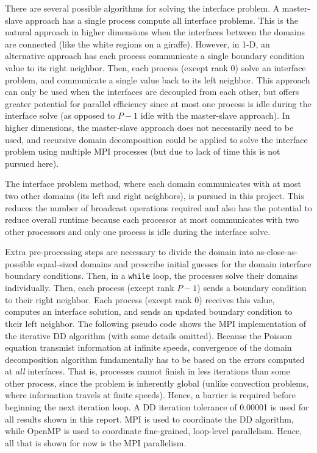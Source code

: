 \documentclass[10pt]{article}
\begin{document}
\begin{enumerate}
There are several possible algorithms for solving the interface problem. A master-slave approach has a single process compute all interface problems. This is the natural approach in higher dimensions when the interfaces between the domains are connected (like the white regions on a giraffe). However, in 1-D, an alternative approach has each process communicate a single boundary condition value to its right neighbor. Then, each process (except rank 0) solve an interface problem, and communicate a single value back to its left neighbor. This approach can only be used when the interfaces are decoupled from each other, but offers greater potential for parallel efficiency since at most one process is idle during the interface solve (as opposed to \(P-1\) idle with the master-slave approach). In higher dimensions, the master-slave approach does not necessarily need to be used, and recursive domain decomposition could be applied to solve the interface problem using multiple MPI processes (but due to lack of time this is not pursued here).
\end{enumerate}

The interface problem method, where each domain communicates with at most two other domains (its left and right neighbors), is pursued in this project. This reduces the number of broadcast operations required and also has the potential to reduce overall runtime because each processor at most communicates with two other processors and only one process is idle during the interface solve. 

Extra pre-processing steps are necessary to divide the domain into as-close-as-possible equal-sized domains and prescribe initial guesses for the domain interface boundary conditions. Then, in a {\tt while} loop, the processes solve their domains individually. Then, each process (except rank \(P-1\)) sends a boundary condition to their right neighbor. Each process (except rank 0) receives this value, computes an interface solution, and sends an updated boundary condition to their left neighbor. The following pseudo code shows the MPI implementation of the iterative DD algorithm (with some details omitted). Because the Poisson equation transmist information at infinite speeds, convergence of the domain decomposition algorithm fundamentally has to be based on the errors computed at {\it all} interfaces. That is, processes cannot finish in less iterations than some other process, since the problem is inherently global (unlike convection problems, where information travels at finite speeds). Hence, a barrier is required before beginning the next iteration loop. A DD iteration tolerance of 0.00001 is used for all results shown in this report. MPI is used to coordinate the DD algorithm, while OpenMP is used to coordinate fine-grained, loop-level parallelism. Hence, all that is shown for now is the MPI parallelism.
\end{document}
